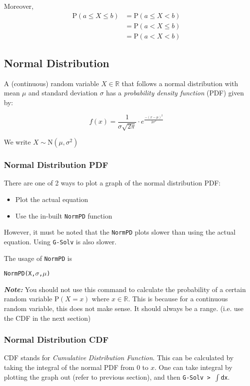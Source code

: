 \documentclass[a5paper,draft]{memoir}
\def\code#1{\texttt{#1}}
\def\note#1{\textbf{\textit{Note:}} #1}
\newcommand{\addtoindex}[1]{#1\index{#1}}
\begin{document}
Moreover, 
\begin{align*}
	\mathrm{P}(a \leq X \leq b) &= \mathrm{P}(a \leq X < b)\\
	&= \mathrm{P}(a < X \leq b) \\
	&= \mathrm{P}(a < X < b)
\end{align*}

\subsection{Normal Distribution}
A (continuous) random variable $X\in \mathbb{R}$ that follows a normal distribution with mean $\mu$ and standard deviation $\sigma$ has a \textit{probability density function} (PDF) given by:

\begin{equation}
	f(x)=\frac{1}{\sigma\sqrt{2\pi}} \cdot e^{\frac{-(x-\mu)^2}{2\sigma^2}}
\end{equation}

We write $X \sim \mathrm{N} (\mu,\sigma^2)$

\subsubsection{Normal Distribution PDF}
There are one of 2 ways to plot a graph of the normal distribution PDF:

\begin{itemize}
	\item Plot the actual equation
	\item Use the in-built \code{NormPD} function
\end{itemize}

However, it must be noted that the \code{NormPD} plots slower than using the actual equation. Using \code{G-Solv} is also slower.

The usage of \code{\addtoindex{NormPD}} is 
\begin{center}
	\code{NormPD(X,$\sigma$,$\mu$)}
\end{center}

\note{You should not use this command to calculate the probability of a certain random variable $\textrm{P}(X = x)$ where $x \in \mathbb{R}$. This is because for a continuous random variable, this does not make sense. It should always be a range. (i.e. use the CDF in the next section)}

\subsubsection{Normal Distribution CDF}
CDF stands for \textit{Cumulative Distribution Function}. This can be calculated by taking the integral of the normal PDF from 0 to $x$. One can take integral by plotting the graph out (refer to previous section), and then \code{G-Solv > $\int$dx}.
\end{document}
